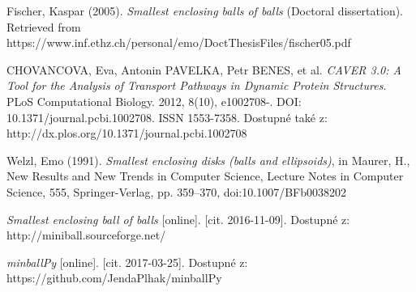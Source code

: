 \begin{thebibliography}{10}

Fischer, Kaspar (2005).
\textit{Smallest enclosing balls of balls} (Doctoral dissertation).
Retrieved from https://www.inf.ethz.ch/personal/emo/DoctThesisFiles/fischer05.pdf

CHOVANCOVA, Eva, Antonin PAVELKA, Petr BENES, et al.
\textit{CAVER 3.0: A Tool for the Analysis of Transport Pathways in Dynamic Protein Structures.}
PLoS Computational Biology. 2012, 8(10), e1002708-. DOI: 10.1371/journal.pcbi.1002708. ISSN 1553-7358. Dostupné také z: http://dx.plos.org/10.1371/journal.pcbi.1002708


Welzl, Emo (1991). \textit{Smallest enclosing disks (balls and ellipsoids)},
in Maurer, H., New Results and New Trends in Computer Science, Lecture Notes in Computer Science,
555, Springer-Verlag, pp. 359–370, doi:10.1007/BFb0038202

\textit{Smallest enclosing ball of balls} [online]. [cit. 2016-11-09]. Dostupné z: http://miniball.sourceforge.net/

\textit{minballPy} [online]. [cit. 2017-03-25]. Dostupné z: https://github.com/JendaPlhak/minballPy

\end{thebibliography}

\cleardoublepage

